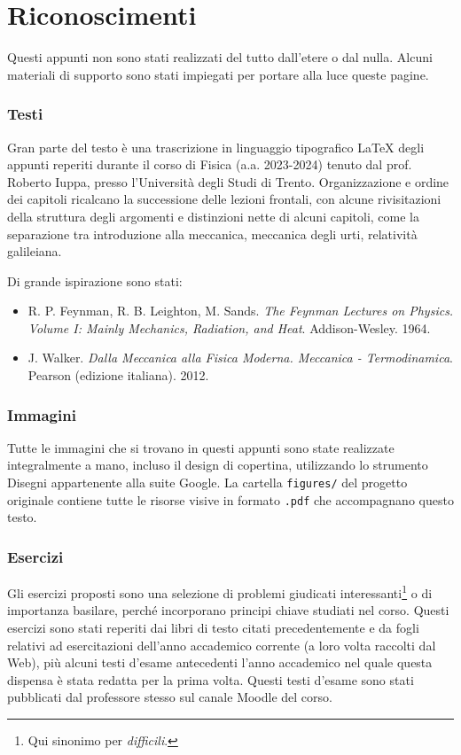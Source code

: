 \section*{Riconoscimenti}
Questi appunti non sono stati realizzati del tutto dall'etere o dal nulla.
Alcuni materiali di supporto sono stati impiegati per portare alla luce
queste pagine.

\subsubsection*{Testi}
Gran parte del testo è una trascrizione in linguaggio tipografico \LaTeX\@
degli appunti reperiti durante
il corso di Fisica (a.a. 2023-2024) tenuto dal prof. Roberto Iuppa, presso
l'Università degli Studi di Trento. Organizzazione e ordine dei
capitoli ricalcano la successione delle lezioni frontali, con alcune
rivisitazioni della struttura degli argomenti e distinzioni nette di
alcuni capitoli, come la separazione tra introduzione alla meccanica,
meccanica degli urti, relatività galileiana.

Di grande ispirazione sono stati:
\begin{itemize}
    \item R. P. Feynman, R. B. Leighton, M. Sands. \textit{The Feynman Lectures on Physics. Volume I: Mainly Mechanics, Radiation, and Heat}. Addison-Wesley. 1964.
    \item J. Walker. \textit{Dalla Meccanica alla Fisica Moderna. Meccanica - Termodinamica}. Pearson (edizione italiana). 2012.
\end{itemize}

\subsubsection*{Immagini}
Tutte le immagini che si trovano in questi appunti sono state realizzate
integralmente a mano, incluso il design di copertina, utilizzando
lo strumento Disegni appartenente alla suite Google. La cartella
\texttt{figures/} del progetto originale contiene tutte le risorse visive
in formato \texttt{.pdf} che accompagnano questo testo.

\subsubsection*{Esercizi}
Gli esercizi proposti sono una selezione di problemi
giudicati interessanti\footnote{Qui sinonimo per \textit{difficili}.} o
di importanza basilare, perché incorporano principi chiave studiati nel corso.
Questi esercizi sono stati reperiti dai libri di testo citati precedentemente
e da fogli relativi ad esercitazioni dell'anno accademico corrente (a loro
volta raccolti dal Web), più alcuni testi d'esame antecedenti l'anno accademico
nel quale questa dispensa è stata redatta per la prima volta. Questi testi
d'esame sono stati pubblicati dal professore stesso sul canale Moodle del corso.